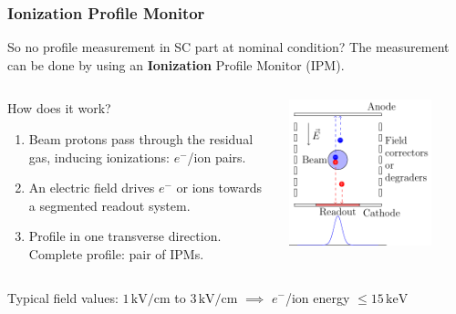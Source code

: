 \begin{frame}[t]
  \frametitle{Ionization Profile Monitor}
  \begin{alertblock}{So no profile measurement in SC part at nominal condition?}
    The measurement can be done by using an \textbf{Ionization} Profile Monitor (IPM).
  \end{alertblock}

  \begin{columns}[T]
    \begin{column}{0.45\textwidth}
      \begin{block}{How does it work?}
        \begin{enumerate}
          \item Beam protons pass through the residual gas, inducing ionizations: $e^-$/ion pairs.
          \item An electric field drives $e^-$ or ions towards a segmented readout system.
          \item Profile in one transverse direction. Complete profile: pair of IPMs.
        \end{enumerate}
      \end{block}
    \end{column}
    \begin{column}{0.45\textwidth}
      \centering
      \includegraphics[width=0.8\textwidth]{02_ESS/fig/fig000_IPM.pdf}
    \end{column}
  \end{columns}
  \vspace{0.5cm}
    Typical field values: $1\,\mathrm{kV/cm}$ to $3\,\mathrm{kV/cm}$ $\implies$ $e^-$/ion energy $\leq 15\,\mathrm{keV}$
\end{frame}

